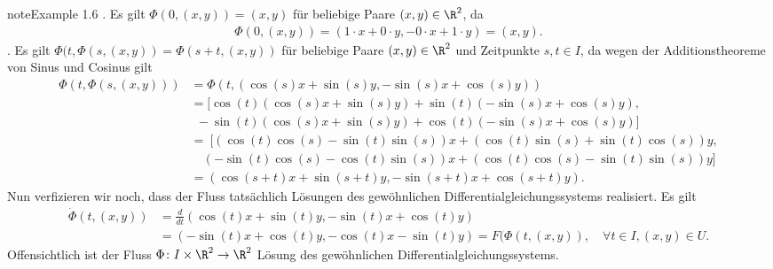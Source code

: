 \documentclass[letterpaper,10pt,english]{jupyterBook}
\begin{document}
\begin{sphinxadmonition}{note}{Example 1.6}
. Es gilt \(\Phi(0, (x,y)) = (x,y)\) für beliebige Paare \((x,y) \in \R^2\), da
\begin{equation*}
\begin{split}\Phi(0, (x,y)) = (1\cdot x + 0\cdot y, - 0 \cdot x + 1 \cdot y) = (x,y).\end{split}
\end{equation*}
. Es gilt \(\Phi(t, \Phi(s,(x,y)) = \Phi(s + t, (x,y))\) für beliebige Paare \((x,y) \in \R^2\) und Zeitpunkte \(s,t \in I\), da wegen der Additionstheoreme von Sinus und Cosinus gilt
\begin{equation*}
\begin{split}\Phi(t, \Phi(s,(x,y))) &= \Phi(t, (\cos(s)x + \sin(s)y, -\sin(s)x + \cos(s)y)) \\
&= [\cos(t)(\cos(s)x + \sin(s)y) + \sin(t)(-\sin(s)x + \cos(s)y), \\
& \ \ -\sin(t)(\cos(s)x + \sin(s)y) + \cos(t)(-\sin(s)x + \cos(s)y)]\\
&= \ [ (\cos(t)\cos(s) - \sin(t)\sin(s))x + (\cos(t)\sin(s) + \sin(t)\cos(s))y, \\
& \quad (-\sin(t)\cos(s) - \cos(t)\sin(s))x + (\cos(t)\cos(s) - \sin(t)\sin(s))y ] \\
&= (\cos(s+t)x + \sin(s+t)y, -\sin(s+t)x + \cos(s+t)y).\end{split}
\end{equation*}
\sphinxAtStartPar
Nun verfizieren wir noch, dass der Fluss tatsächlich Lösungen des gewöhnlichen Differentialgleichungssystems realisiert.
Es gilt
\begin{equation*}
\begin{split}\dot{\Phi}(t, (x,y)) &= \frac{d}{dt}(\cos(t)x + \sin(t)y, -\sin(t)x + \cos(t)y) \\
&= (-\sin(t)x + \cos(t)y, -\cos(t)x - \sin(t)y) = F(\Phi(t,(x,y)), \quad \forall t \in I, (x,y) \in U.\end{split}
\end{equation*}
\sphinxAtStartPar
Offensichtlich ist der Fluss \(\Phi \colon I \times \R^2 \rightarrow \R^2\) Lösung des gewöhnlichen Differentialgleichungssystems.
\end{sphinxadmonition}
\end{document}
